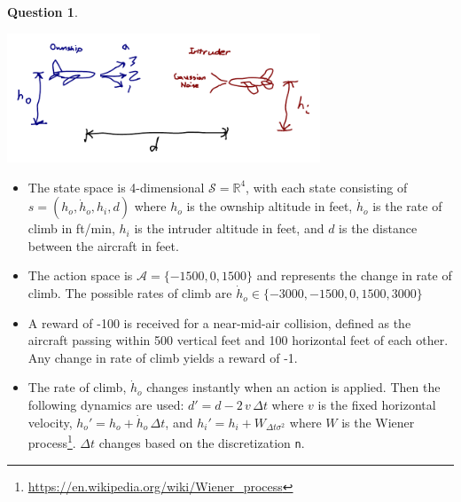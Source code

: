 \documentclass{article}
\theoremstyle{definition}
\newtheorem{question}[thm]{Question}
\newcommand{\reals}{\mathbb{R}}
\begin{document}
\begin{question}
\begin{center}
    \includegraphics[width=0.7\textwidth]{unresponsive_acas.pdf}
\end{center}

\begin{itemize}
    \item The state space is 4-dimensional $\mathcal{S} = \reals^4$, with each state consisting of $s=(h_o, \dot{h}_o, h_i, d)$ where $h_o$ is the ownship altitude in feet, $\dot{h}_o$ is the rate of climb in ft/min, $h_i$ is the intruder altitude in feet, and $d$ is the distance between the aircraft in feet.
    \item The action space is $\mathcal{A}=\{-1500, 0, 1500\}$ and represents the change in rate of climb. The possible rates of climb are $\dot{h}_o \in \{-3000, -1500, 0, 1500, 3000\}$
    \item A reward of -100 is received for a near-mid-air collision, defined as the aircraft passing within 500 vertical feet and 100 horizontal feet of each other. Any change in rate of climb yields a reward of -1.
    \item The rate of climb, $\dot{h}_o$ changes instantly when an action is applied. Then the following dynamics are used: $d' = d - 2\,v\,\Delta t$ where $v$ is the fixed horizontal velocity, $h_o' = h_o + \dot{h}_o\,\Delta t$, and $h_i' = h_i + W_{\Delta t \sigma^2}$ where $W$ is the Wiener process\footnote{\url{https://en.wikipedia.org/wiki/Wiener_process}}. $\Delta t$ changes based on the discretization \texttt{n}.
\end{itemize}


\end{question}
\end{document}
